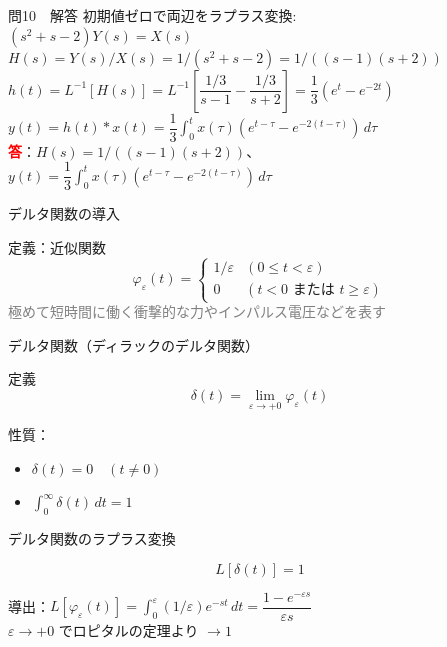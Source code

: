\documentclass[professionalfonts]{beamer}
\begin{document}
\begin{frame}{問10　解答}
  初期値ゼロで両辺をラプラス変換:\\[4pt]
  $(s^{2}+s-2)Y(s) = X(s)$\\[4pt]
  $H(s) = Y(s)/X(s) = 1/(s^{2}+s-2) = 1/((s-1)(s+2))$\\[8pt]
  $h(t) = L^{-1}[H(s)] = L^{-1}\left[\dfrac{1/3}{s-1} - \dfrac{1/3}{s+2}\right] = \dfrac{1}{3}(e^{t} - e^{-2t})$\\[4pt]
  $y(t) = h(t) * x(t) = \dfrac{1}{3}\int_{0}^t x(\tau)(e^{t-\tau} - e^{-2(t-\tau)})\, d\tau$
  \\[8pt]\textcolor{red}{\textbf{答}}：$H(s) = 1/((s-1)(s+2))$、$y(t) = \dfrac{1}{3}\int_{0}^t x(\tau)(e^{t-\tau} - e^{-2(t-\tau)})\, d\tau$
\end{frame}

\begin{frame}{デルタ関数の導入}
  \begin{block}{定義：近似関数}
  \[
    \varphi_\varepsilon(t) = \begin{cases} 1/\varepsilon & (0 \leq t < \varepsilon) \\ 0 & (t < 0 \text{ または } t \geq \varepsilon) \end{cases}
  \]
  {\footnotesize \textcolor{gray}{極めて短時間に働く衝撃的な力やインパルス電圧などを表す}}
  \end{block}
\end{frame}

\begin{frame}{デルタ関数（ディラックのデルタ関数）}
  \begin{block}{定義}
  \[
    \delta(t) = \lim_{\varepsilon \to +0} \varphi_\varepsilon(t)
  \]
  \end{block}
  \vspace{8pt}
  性質：\\[4pt]
  \begin{itemize}
    \item $\delta(t) = 0 \quad (t \neq 0)$
    \item $\displaystyle\int_{0}^{\infty} \delta(t)\, dt = 1$
  \end{itemize}
\end{frame}

\begin{frame}{デルタ関数のラプラス変換}
  \begin{block}{}
  \[
    L[\delta(t)] = 1
  \]
  \end{block}
  \vspace{4pt}
  導出：$L[\varphi_\varepsilon(t)] = \int_0^\varepsilon (1/\varepsilon) e^{-st}\, dt = \dfrac{1-e^{-\varepsilon s}}{\varepsilon s}$\\[8pt]
  $\varepsilon \to +0$ でロピタルの定理より $\to 1$
\end{frame}
\end{document}
